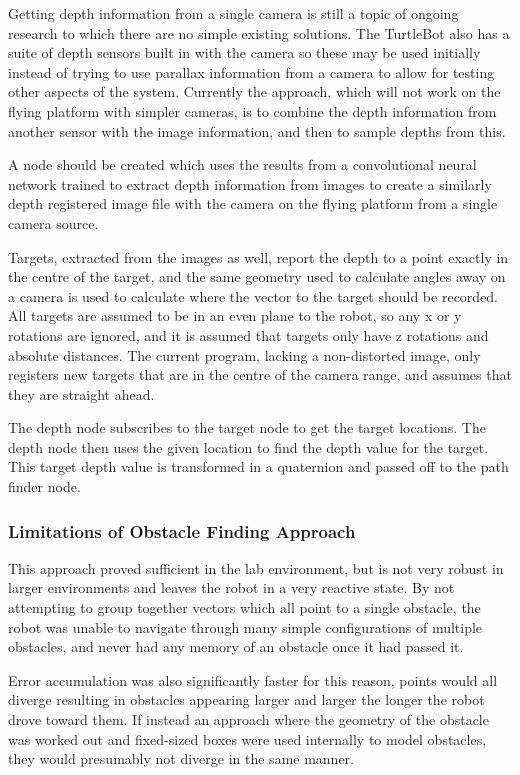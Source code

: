 \documentclass{article}[12]
\begin{document}
	Getting depth information from a single camera is still a topic of ongoing research to which there are no simple existing solutions. The TurtleBot also has a suite of depth sensors built in with the camera so these may be used initially instead of trying to use parallax information from a camera to allow for testing other aspects of the system. Currently the approach, which will not work on the flying platform with simpler cameras, is to combine the depth information from another sensor with the image information, and then to sample depths from this.
	
	A node should be created which uses the results from a convolutional neural network trained to extract depth information from images to create a similarly depth registered image file with the camera on the flying platform from a single camera source.
	
	Targets, extracted from the images as well, report the depth to a point exactly in the centre of the target, and the same geometry used to calculate angles away on a camera is used to calculate where the vector to the target should be recorded. All targets are assumed to be in an even plane to the robot, so any x or y rotations are ignored, and it is assumed that targets only have z rotations and absolute distances. The current program, lacking a non-distorted image, only registers new targets that are in the centre of the camera range, and assumes that they are straight ahead.
 
 	The depth node subscribes to the target node to get the target locations. The depth node then uses the given location to find the depth value for the target. This target depth value is transformed in a quaternion and passed off to the path finder node. 
 
 \subsubsection{Limitations of Obstacle Finding Approach}
 
 This approach proved sufficient in the lab environment, but is not very robust in larger environments and leaves the robot in a very reactive state. By not attempting to group together vectors which all point to a single obstacle, the robot was unable to navigate through many simple configurations of multiple obstacles, and never had any memory of an obstacle once it had passed it. 
 
 Error accumulation was also significantly faster for this reason, points would all diverge resulting in obstacles appearing larger and larger the longer the robot drove toward them. If instead an approach where the geometry of the obstacle was worked out and fixed-sized boxes were used internally to model obstacles, they would presumably not diverge in the same manner. 
	
\end{document}
